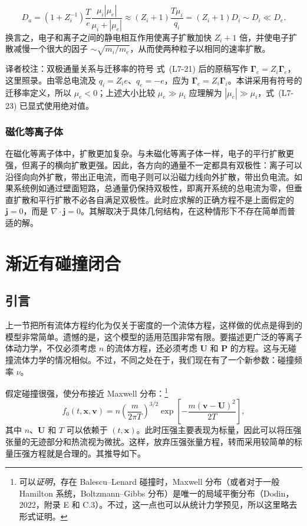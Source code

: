 \begin{equation}
D_a=(1+Z_i^{-1})\frac Te\frac{\mu_i|\mu_e|}{\mu_i+|\mu_e|}
\approx(Z_i+1)\frac{T\mu_i}{q_i}
=(Z_i+1)D_i\sim D_i\ll D_e.
\tag{L7-23}\label{eq:L7:23}
\end{equation}
换言之，电子和离子之间的静电相互作用使离子扩散加快 $Z_i+1$ 倍，并使电子扩散减慢一个很大的因子 $\sim\sqrt{m_i/m_e}$，从而使两种粒子以相同的速率扩散。
\begin{correction}{译者校注：双极通量关系与迁移率的符号}
式~(L7-21) 后的原稿写作 $\boldsymbol\Gamma_e=Z_i\boldsymbol\Gamma_e$，这里照录。由零总电流及 $q_i=Z_ie$、$q_e=-e$，应为 $\boldsymbol\Gamma_e=Z_i\boldsymbol\Gamma_i$。本讲采用有符号的迁移率定义，所以 $\mu_e<0$；上述大小比较 $\mu_e\gg\mu_i$ 应理解为 $|\mu_e|\gg\mu_i$，式~(L7-23) 已显式使用绝对值。
\end{correction}

\subsubsection{磁化等离子体}
在磁化等离子体中，扩散更加复杂。与未磁化等离子体一样，电子的平行扩散更强，但离子的横向扩散更强。因此，各方向的通量不一定都具有双极性：离子可以沿径向向外扩散，带出正电流，而电子则可以沿磁力线向外扩散，带出负电流。如果系统例如通过壁面短路，总通量仍保持双极性，即离开系统的总电流为零，但垂直扩散和平行扩散不必各自满足双极性。此时应求解的正确方程不是上面假定的 $\boldsymbol j=0$，而是 $\nabla\cdot\boldsymbol j=0$。其解取决于具体几何结构，在这种情形下不存在简单而普适的解。

\section{渐近有碰撞闭合}
\subsection{引言}
上一节把所有流体方程约化为仅关于密度的一个流体方程，这样做的优点是得到的模型非常简单。遗憾的是，这个模型的适用范围非常有限。要描述更广泛的等离子体动力学，不仅必须考虑 $n$ 的流体方程，还必须考虑 $\boldsymbol U$ 和 $\boldsymbol P$ 的方程。这与无碰撞流体力学的情况相似。不过，不同之处在于，我们现在有了一个新参数：碰撞频率 $\nu$。

假定碰撞很强，使分布接近 Maxwell 分布：\footnote{可以\emph{证明}，存在 Balescu--Lenard 碰撞时，Maxwell 分布（或者对于一般 Hamilton 系统，Boltzmann--Gibbs 分布）是唯一的局域平衡分布（Dodin，2022，附录 E 和 C.3）。不过，这一点也可以从统计力学预见，所以这里略去形式证明。}
\begin{equation}
f_0(t,\boldsymbol x,\boldsymbol v)
=n\left(\frac m{2\pi T}\right)^{3/2}
\exp\left[-\frac{m(\boldsymbol v-\boldsymbol U)^2}{2T}\right],
\tag{L7-24}\label{eq:L7:24}
\end{equation}
其中 $n$、$\boldsymbol U$ 和 $T$ 可以依赖于 $(t,\boldsymbol x)$。此时压强主要表现为标量，因此可以将压强张量的无迹部分和热流视为微扰。这样，放弃压强张量方程，转而采用较简单的标量压强方程就是合理的。其推导如下。

